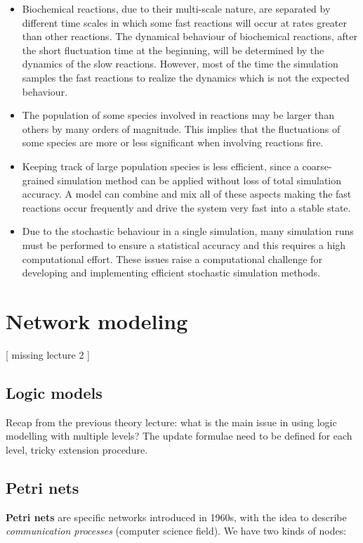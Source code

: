   \begin{itemize}
    \item Biochemical reactions, due to their multi-scale nature, are separated by different time scales in which some fast reactions will occur at rates greater than other reactions.
      The dynamical behaviour of biochemical reactions, after the short fluctuation time at the beginning, will be determined by the dynamics of the slow reactions.
      However, most of the time the simulation samples the fast reactions to realize the dynamics which is not the expected behaviour.
    \item The population of some species involved in reactions may be larger than others by many orders of magnitude.
      This implies that the fluctuations of some species are more or less significant when involving reactions fire.
    \item Keeping track of large population species is less efficient, since a coarse-grained simulation method can be applied without loss of total simulation accuracy.
      A model can combine and mix all of these aspects making the fast reactions occur frequently and drive the system very fast into a stable state.
    \item Due to the stochastic behaviour in a single simulation, many simulation runs must be performed to ensure a statistical accuracy and this requires a high computational effort.
      These issues raise a computational challenge for developing and implementing efficient stochastic simulation methods.
  \end{itemize}

\section{Network modeling}

[ missing lecture 2 ]

  \subsection{Logic models}
  Recap from the previous theory lecture: what is the main issue in using logic modelling with multiple levels? The update formulae need to be defined for each level, tricky extension procedure.

  \subsection{Petri nets}
  \textbf{Petri nets} are specific networks introduced in 1960s, with the idea to describe \emph{communication processes} (computer science field).
  We have two kinds of nodes:

